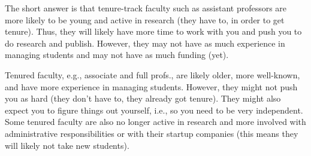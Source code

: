 \documentclass[11pt]{article}
\newenvironment{commentbox}[1][]{
\small
    \begin{mybox}
    {\small \textbf{#1}}
 }{
   \end{mybox}
}
\begin{document}
The short answer is that tenure-track faculty such as assistant professors are more likely to be young and active in research (they have to, in order to get tenure). Thus, they will likely have more time to work with you and push you to do research and publish. However, they may not have as much experience in managing students and may not have as much funding (yet).

Tenured faculty, e.g., associate and full profs., are likely older, more well-known, and have more experience in managing students.  However, they might not push you as hard (they don't have to, they already got tenure). They might also expect you to figure things out yourself, i.e., so you need to be very independent.  Some tenured faculty are also no longer active in research and more involved with administrative responsibilities or with their startup companies (this means they will likely not take new students). 


\end{document}

